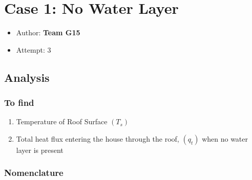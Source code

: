 \documentclass[11pt]{article}
\providecommand{\tightlist}{%
      \setlength{\itemsep}{0pt}\setlength{\parskip}{0pt}}
\begin{document}
       \date{}
    

    
    \hypertarget{case-1-no-water-layer}{%
\section{Case 1: No Water Layer}\label{case-1-no-water-layer}}

\begin{itemize}
\tightlist
\item
  Author: \textbf{Team G15}
\item
  Attempt: 3
\end{itemize}

    \hypertarget{analysis}{%
\subsection{Analysis}\label{analysis}}

    \hypertarget{to-find}{%
\subsubsection{To find}\label{to-find}}

\begin{enumerate}
\def\labelenumi{\arabic{enumi}.}
\tightlist
\item
  Temperature of Roof Surface \((T_s)\)
\item
  Total heat flux entering the house through the roof, \((q_t)\) when no
  water layer is present
\end{enumerate}

    \hypertarget{nomenclature}{%
\subsubsection{Nomenclature}\label{nomenclature}}
\end{document}
